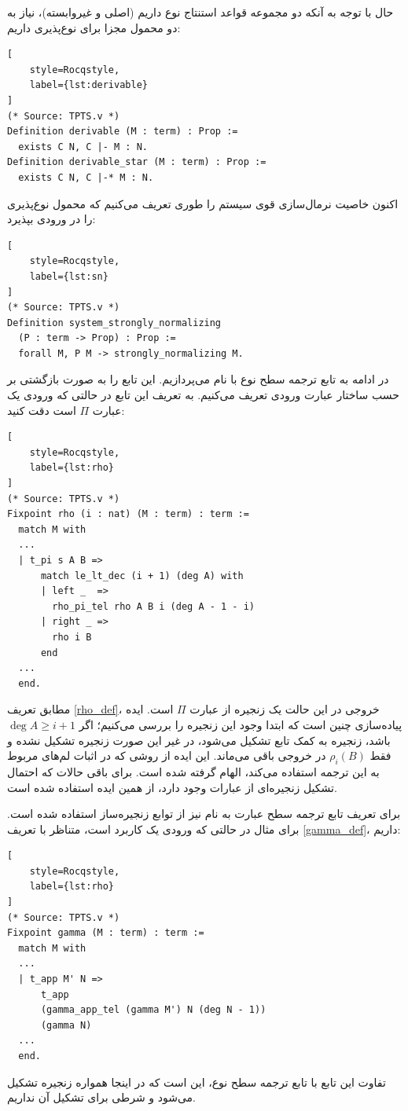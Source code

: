 \documentclass[11pt,twocolumn,a4paper,twoside]{article}
\theoremstyle{definition}
\theoremstyle{theorem}
\theoremstyle{definition}
\theoremstyle{definition}
\theoremstyle{definition}
\theoremstyle{definition}
\theoremstyle{definition}
\newcommand{\varname}[1]{\lr{\texttt{\footnotesize\detokenize{#1}}}}
\begin{document}
حال با توجه به آنکه دو مجموعه قواعد استنتاج نوع داریم (اصلی و غیروابسته)، نیاز به دو محمول مجزا برای نوع‌پذیری داریم:
\begin{latin}
\begin{lstlisting}[
    style=Rocqstyle,
    label={lst:derivable}
]
(* Source: TPTS.v *)
Definition derivable (M : term) : Prop := 
  exists C N, C |- M : N.
Definition derivable_star (M : term) : Prop :=
  exists C N, C |-* M : N.
\end{lstlisting}
\end{latin}
اکنون خاصیت نرمال‌سازی قوی سیستم را طوری تعریف می‌کنیم که محمول نوع‌پذیری را در ورودی بپذیرد:
\begin{latin}
\begin{lstlisting}[
    style=Rocqstyle,
    label={lst:sn}
]
(* Source: TPTS.v *)
Definition system_strongly_normalizing 
  (P : term -> Prop) : Prop :=
  forall M, P M -> strongly_normalizing M.
\end{lstlisting}
\end{latin}

در ادامه به تابع ترجمه سطح نوع با نام \varname{rho} می‌پردازیم. این تابع را به صورت بازگشتی بر حسب ساختار عبارت ورودی تعریف می‌کنیم. به تعریف این تابع در حالتی که ورودی یک عبارت $\Pi$ است دقت کنید:
\begin{latin}
\begin{lstlisting}[
    style=Rocqstyle,
    label={lst:rho}
]
(* Source: TPTS.v *)
Fixpoint rho (i : nat) (M : term) : term :=
  match M with
  ...
  | t_pi s A B =>
      match le_lt_dec (i + 1) (deg A) with
      | left _  => 
        rho_pi_tel rho A B i (deg A - 1 - i)
      | right _ => 
        rho i B
      end
  ...
  end.
\end{lstlisting}
\end{latin}
مطابق تعریف \ref{rho_def}، خروجی در این حالت یک زنجیره از عبارت $\Pi$ است. ایده پیاده‌سازی چنین است که ابتدا وجود این زنجیره را بررسی می‌کنیم؛ اگر $\operatorname{deg}A \ge i + 1$ باشد، زنجیره به کمک تابع \varname{rho_pi_tel} تشکیل می‌شود، در غیر این صورت زنجیره تشکیل نشده و فقط $\rho_i(B)$ در خروجی باقی می‌ماند. این ایده از روشی که  در اثبات لم‌های مربوط به این ترجمه استفاده می‌کند، الهام گرفته شده است. برای باقی حالات که احتمال تشکیل زنجیره‌ای از عبارات وجود دارد، از همین ایده استفاده شده است.

برای تعریف تابع ترجمه سطح عبارت به نام \varname{gamma} نیز از توابع زنجیره‌ساز استفاده شده است. برای مثال در حالتی که ورودی یک کاربرد است، متناظر با تعریف \ref{gamma_def}، داریم:
\begin{latin}
\begin{lstlisting}[
    style=Rocqstyle,
    label={lst:rho}
]
(* Source: TPTS.v *)
Fixpoint gamma (M : term) : term :=
  match M with
  ...
  | t_app M' N =>
      t_app
      (gamma_app_tel (gamma M') N (deg N - 1)) 
      (gamma N)
  ...
  end.
\end{lstlisting}
\end{latin}
تفاوت این تابع با تابع ترجمه سطح نوع، این است که در اینجا همواره زنجیره تشکیل می‌شود و شرطی برای تشکیل آن نداریم.
\end{document}
